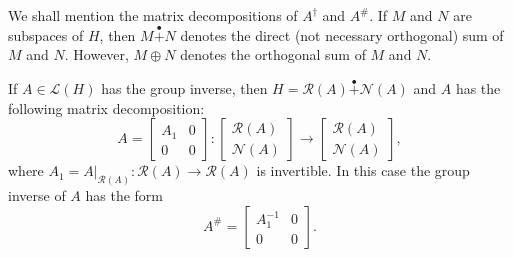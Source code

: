 \documentclass{proc-l}
\theoremstyle{plain}
\theoremstyle{remark}
\theoremstyle{definition}
\begin{document}
We shall mention the matrix decompositions of $A^{\dag }$ and $A^{\#}$. If $M
$ and $N$ are subspaces of $H$, then $M\overset{\bullet}{+} N$ denotes the
direct (not necessary orthogonal) sum of $M$ and $N$. However, $M\oplus N$
denotes the orthogonal sum of $M$ and $N$.

If $A\in \mathcal{L} (H)$ has the group inverse, then $H=\mathcal{R} (A)%
\overset{\bullet}{+} \mathcal{N} (A)$ and $A$ has the following matrix
decomposition: 
\begin{equation*}
A=%
\begin{bmatrix}
A_{1} & 0 \\ 
0 & 0%
\end{bmatrix}
:%
\begin{bmatrix}
\mathcal{R} (A) \\ 
\mathcal{N} (A)%
\end{bmatrix}
\to 
\begin{bmatrix}
\mathcal{R} (A) \\ 
\mathcal{N} (A)%
\end{bmatrix}
,  \tag{1}
\end{equation*}
where $A_{1}=A|_{\mathcal{R} (A)}:\mathcal{R} (A)\to \mathcal{R} (A)$ is
invertible. In this case the group inverse of $A$ has the form 
\begin{equation*}
A^{\#}=%
\begin{bmatrix}
A_{1}^{-1} & 0 \\ 
0 & 0%
\end{bmatrix}
.
\end{equation*}
\end{document}
